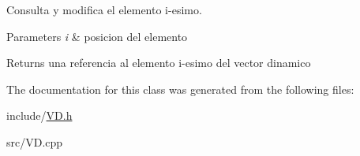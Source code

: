 Consulta y modifica el elemento i-\/esimo. 


\begin{DoxyParams}{Parameters}
{\em i} & posicion del elemento \\
\hline
\end{DoxyParams}
\begin{DoxyReturn}{Returns}
una referencia al elemento i-\/esimo del vector dinamico 
\end{DoxyReturn}


The documentation for this class was generated from the following files\+:\begin{DoxyCompactItemize}
\item 
include/\hyperlink{_v_d_8h}{V\+D.\+h}\item 
src/V\+D.\+cpp\end{DoxyCompactItemize}
